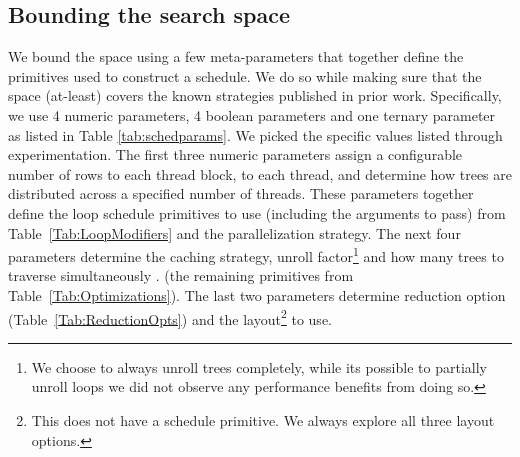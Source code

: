 \subsection{Bounding the search space}
We bound the space using a few meta-parameters that together define 
the primitives used to construct a schedule. We do so while making sure 
that the space (at-least) covers the known strategies published in prior work.
Specifically, we use 4 numeric parameters, 4 boolean parameters and one ternary parameter as listed in Table \ref{tab:schedparams}.
We picked the specific values listed through experimentation.
The first three numeric parameters assign a configurable number of rows to each 
thread block, to each thread, and determine how trees are distributed across a
specified number of threads. These parameters together define the loop schedule 
primitives to use (including the arguments to pass) from Table~\ref{Tab:LoopModifiers} 
and the parallelization strategy. The next four parameters determine the caching strategy, 
unroll factor{\footnote{We choose to always unroll trees completely, while its possible 
to partially unroll loops we did not observe any performance benefits from doing so.}} 
and how many trees to traverse simultaneously .  (the remaining primitives from Table~\ref{Tab:Optimizations}).  
The last two parameters determine reduction option (Table~\ref{Tab:ReductionOpts}) and the layout{\footnote{This does not have a schedule primitive. We always explore all three layout options.}} to use.

